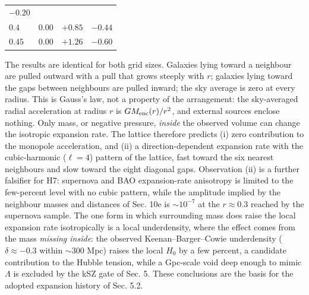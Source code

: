 \documentclass[
]{article}
\begin{document}
\begin{longtable}[]{@{}llll@{}}
\begin{minipage}[t]{0.22\columnwidth}
\(-0.20\)\strut
\end{minipage}\tabularnewline
\begin{minipage}[t]{0.22\columnwidth}\raggedright
\(0.4\)\strut
\end{minipage} & \begin{minipage}[t]{0.22\columnwidth}\raggedright
\(0.00\)\strut
\end{minipage} & \begin{minipage}[t]{0.22\columnwidth}\raggedright
\(+0.85\)\strut
\end{minipage} & \begin{minipage}[t]{0.22\columnwidth}\raggedright
\(-0.44\)\strut
\end{minipage}\tabularnewline
\begin{minipage}[t]{0.22\columnwidth}\raggedright
\(0.45\)\strut
\end{minipage} & \begin{minipage}[t]{0.22\columnwidth}\raggedright
\(0.00\)\strut
\end{minipage} & \begin{minipage}[t]{0.22\columnwidth}\raggedright
\(+1.26\)\strut
\end{minipage} & \begin{minipage}[t]{0.22\columnwidth}\raggedright
\(-0.60\)\strut
\end{minipage}\tabularnewline
\bottomrule
\end{longtable}

The results are identical for both grid sizes. Galaxies lying toward a
neighbour are pulled outward with a pull that grows steeply with \(r\);
galaxies lying toward the gaps between neighbours are pulled inward; the
sky average is zero at every radius. This is Gauss's law, not a property
of the arrangement: the sky-averaged radial acceleration at radius \(r\)
is \(G M_{\rm enc}(r)/r^2\), and external sources enclose nothing. Only
mass, or negative pressure, \emph{inside} the observed volume can change
the isotropic expansion rate. The lattice therefore predicts (i) zero
contribution to the monopole acceleration, and (ii) a
direction-dependent expansion rate with the cubic-harmonic
(\(\ell = 4\)) pattern of the lattice, fast toward the six nearest
neighbours and slow toward the eight diagonal gaps. Observation (ii) is
a further falsifier for H7: supernova and BAO expansion-rate anisotropy
is limited to the few-percent level with no cubic pattern, while the
amplitude implied by the neighbour masses and distances of Sec. 10e is
\(\sim\!10^{-7}\) at the \(r \approx 0.3\) reached by the supernova
sample. The one form in which surrounding mass does raise the local
expansion rate isotropically is a local underdensity, where the effect
comes from the mass \emph{missing inside}: the observed
Keenan--Barger--Cowie underdensity (\(\delta \approx -0.3\) within
\(\sim\!300\) Mpc) raises the local \(H_0\) by a few percent, a
candidate contribution to the Hubble tension, while a Gpc-scale void
deep enough to mimic \(\Lambda\) is excluded by the kSZ gate of Sec. 5.
These conclusions are the basis for the adopted expansion history of
Sec. 5.2.
\end{document}
